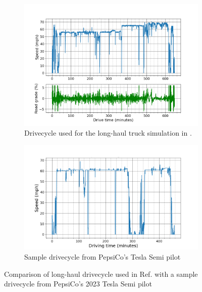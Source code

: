 \begin{figure}[ht]
    \centering
    \begin{subfigure}[b]{0.49\textwidth}
        \centering
        \includegraphics[width=\textwidth]{figures/long_haul_drivecycle.png}
        \caption{Drivecycle used for the long-haul truck simulation in \cite{Sader_2023}.}
        \label{fig:long_haul_drivecycle}
    \end{subfigure}
    \hfill
    \begin{subfigure}[b]{0.49\textwidth}
        \centering
        \includegraphics[width=\textwidth]{figures/pepsi_3_drive_cycle_24_paper.png}
        \caption{Sample drivecycle from PepsiCo's Tesla Semi pilot}
        \label{fig:sample_pepsico_drivecycle}
    \end{subfigure}
    \caption{Comparison of long-haul drivecycle used in Ref. \cite{Sader_2023} with a sample drivecycle from PepsiCo's 2023 Tesla Semi pilot}
    \label{fig:drivecycles}
\end{figure}

